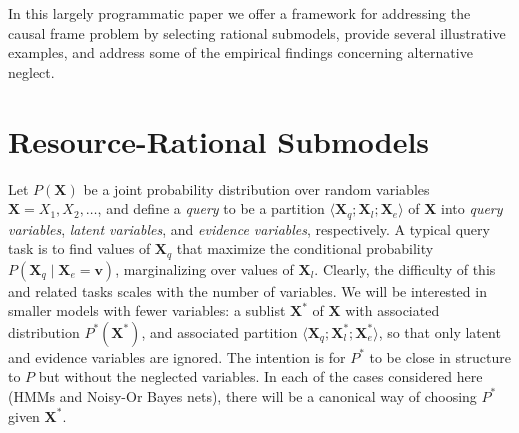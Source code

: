 \documentclass[10pt,letterpaper]{article}
\begin{document}
In this largely programmatic paper we offer a framework for addressing the causal frame problem by selecting rational submodels, provide several illustrative examples, and address some of the empirical findings concerning alternative neglect.

\section{Resource-Rational Submodels}

Let $P(\textbf{X})$ be a joint probability distribution over random variables $\textbf{X} = X_1,X_2,\dots$, and define a \emph{query} to be a partition $\langle \textbf{X}_q;\textbf{X}_l;\textbf{X}_e\rangle$ of \textbf{X} into \emph{query variables}, \emph{latent variables}, and \emph{evidence variables}, respectively. A typical query task is to find values of $\textbf{X}_q$ that maximize the conditional probability $P(\textbf{X}_q\mid \textbf{X}_e = \textbf{v})$, marginalizing over values of $\textbf{X}_l$. Clearly, the difficulty of this and related tasks scales with the number of variables. We will be interested in smaller models with fewer variables: a sublist $\textbf{X}^*$ of $\textbf{X}$ with associated distribution $P^*(\textbf{X}^*)$, and associated partition $\langle \textbf{X}_q;\textbf{X}_l^*;\textbf{X}_e^*\rangle$, so that only latent and evidence variables are ignored. 
The intention is for $P^{*}$ to be close in structure to $P$ but without the neglected variables.
In each of the cases considered here (HMMs and Noisy-Or Bayes nets), there will be a canonical way of choosing $P^*$ given $\textbf{X}^*$.
\end{document}
